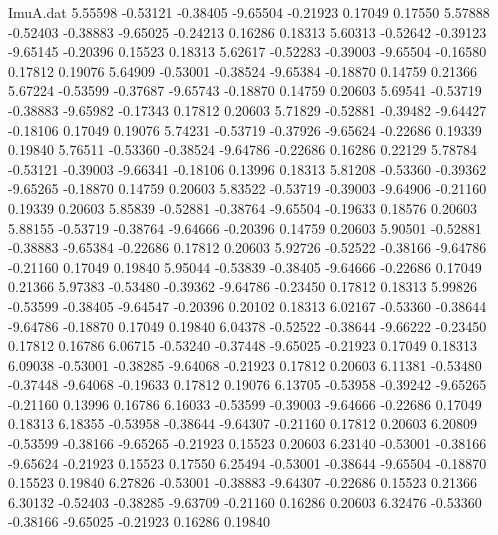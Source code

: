 \begin{filecontents}{ImuA.dat}
   5.55598   -0.53121   -0.38405   -9.65504   -0.21923    0.17049    0.17550
   5.57888   -0.52403   -0.38883   -9.65025   -0.24213    0.16286    0.18313
   5.60313   -0.52642   -0.39123   -9.65145   -0.20396    0.15523    0.18313
   5.62617   -0.52283   -0.39003   -9.65504   -0.16580    0.17812    0.19076
   5.64909   -0.53001   -0.38524   -9.65384   -0.18870    0.14759    0.21366
   5.67224   -0.53599   -0.37687   -9.65743   -0.18870    0.14759    0.20603
   5.69541   -0.53719   -0.38883   -9.65982   -0.17343    0.17812    0.20603
   5.71829   -0.52881   -0.39482   -9.64427   -0.18106    0.17049    0.19076
   5.74231   -0.53719   -0.37926   -9.65624   -0.22686    0.19339    0.19840
   5.76511   -0.53360   -0.38524   -9.64786   -0.22686    0.16286    0.22129
   5.78784   -0.53121   -0.39003   -9.66341   -0.18106    0.13996    0.18313
   5.81208   -0.53360   -0.39362   -9.65265   -0.18870    0.14759    0.20603
   5.83522   -0.53719   -0.39003   -9.64906   -0.21160    0.19339    0.20603
   5.85839   -0.52881   -0.38764   -9.65504   -0.19633    0.18576    0.20603
   5.88155   -0.53719   -0.38764   -9.64666   -0.20396    0.14759    0.20603
   5.90501   -0.52881   -0.38883   -9.65384   -0.22686    0.17812    0.20603
   5.92726   -0.52522   -0.38166   -9.64786   -0.21160    0.17049    0.19840
   5.95044   -0.53839   -0.38405   -9.64666   -0.22686    0.17049    0.21366
   5.97383   -0.53480   -0.39362   -9.64786   -0.23450    0.17812    0.18313
   5.99826   -0.53599   -0.38405   -9.64547   -0.20396    0.20102    0.18313
   6.02167   -0.53360   -0.38644   -9.64786   -0.18870    0.17049    0.19840
   6.04378   -0.52522   -0.38644   -9.66222   -0.23450    0.17812    0.16786
   6.06715   -0.53240   -0.37448   -9.65025   -0.21923    0.17049    0.18313
   6.09038   -0.53001   -0.38285   -9.64068   -0.21923    0.17812    0.20603
   6.11381   -0.53480   -0.37448   -9.64068   -0.19633    0.17812    0.19076
   6.13705   -0.53958   -0.39242   -9.65265   -0.21160    0.13996    0.16786
   6.16033   -0.53599   -0.39003   -9.64666   -0.22686    0.17049    0.18313
   6.18355   -0.53958   -0.38644   -9.64307   -0.21160    0.17812    0.20603
   6.20809   -0.53599   -0.38166   -9.65265   -0.21923    0.15523    0.20603
   6.23140   -0.53001   -0.38166   -9.65624   -0.21923    0.15523    0.17550
   6.25494   -0.53001   -0.38644   -9.65504   -0.18870    0.15523    0.19840
   6.27826   -0.53001   -0.38883   -9.64307   -0.22686    0.15523    0.21366
   6.30132   -0.52403   -0.38285   -9.63709   -0.21160    0.16286    0.20603
   6.32476   -0.53360   -0.38166   -9.65025   -0.21923    0.16286    0.19840

\end{filecontents}
